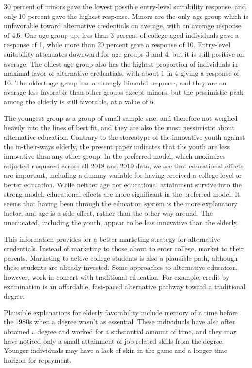 \documentclass[AER]{/Users/zyl357/Documents/GitHub/research-dissertation-case-for-alt-ed/papers/alt-ed-survey/aea-latex-templates/AEA}
\begin{document}
30 percent of minors gave the lowest possible entry-level suitability response,
and only 10 percent gave the highest response. Minors are the only age group
which is unfavorable toward alternative credentials on average, with an
average response of 4.6. One age group up, less than 3 percent of college-aged
individuals gave a response of 1, while more than 20 percent gave a response of
10. Entry-level suitability attenuates downward for age groups 3 and 4,
but it is still positive on average. The oldest age group also has the
highest proportion of individuals in maximal favor of alternative
credentials, with about 1 in 4 giving a response of 10. The oldest age
group has a strongly bimodal response, and they are on average less
favorable than other groups except minors, but the pessimistic peak among
the elderly is still favorable, at a value of 6.

The youngest group is a group of small sample size, and therefore not
weighed heavily into the lines of best fit, and they are also the most
pessimistic about alternative education. Contrary to the stereotype of the
innovative youth against the in-their-ways elderly, the present paper
indicates that the youth are less innovative than any other group. In the
preferred model, which maximizes adjusted r-squared across all 2018 and
2019 data, we see that educational effects are important, including a
dummy variable for having received a college-level or better education.
While neither age nor educational attainment survive into the strong
model, educational effects are more significant in the preferred model. It
seems that having been through the education system is the more
explanatory factor, and age is a side-effect, rather than the other way
around. The uneducated, including the youth, appear to be less innovative
than the elderly.

This information provides for a better marketing strategy for alternative
credentials. Instead of marketing to those about to enter college, market
to their parents. Marketing to active college students is also a plausible
path, although these students are already invested. Some approaches to
alternative education, however, work in concert with traditional
education. For example, credit by examination is an affordable, fast-paced
alternative pathway toward a traditional degree.

Plausible explanations for elderly favorability include memory of a time
before the 1980s when a degree wasn’t as essential. These individuals have
also often obtained a degree and worked for a substantial amount of time,
and they may have noticed only a small attainment of job-related skills
from the degree. Younger individuals may have a lack of skin in the game
and a longer time horizon for repayment.
\end{document}
